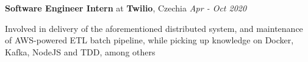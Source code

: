 {\textbf{Software Engineer Intern} at \textbf{Twilio}, Czechia} 
        \hfill {\textit{Apr - Oct 2020}}
    
    Involved in delivery of the aforementioned distributed system, and maintenance of AWS-powered ETL batch pipeline, while picking up knowledge on Docker, Kafka, NodeJS and TDD, among others